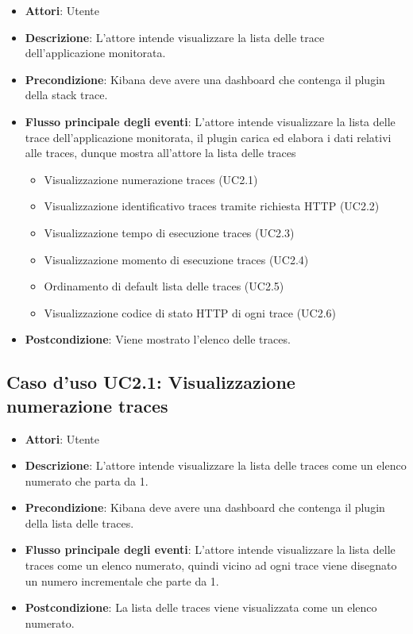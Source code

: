 \begin{itemize}
\item \textbf{Attori}: Utente
\item \textbf{Descrizione}: L'attore intende visualizzare la lista delle trace dell'applicazione monitorata. 
\item \textbf{Precondizione}: Kibana deve avere una dashboard che contenga il plugin della stack trace.
\item \textbf{Flusso principale degli eventi}: L'attore intende visualizzare la lista delle trace dell'applicazione monitorata, il plugin carica ed elabora i dati relativi alle traces, dunque mostra all'attore la lista delle traces
\begin{itemize}
\item Visualizzazione numerazione traces (UC2.1)
\item Visualizzazione identificativo traces tramite richiesta HTTP (UC2.2)
\item Visualizzazione tempo di esecuzione traces (UC2.3)
\item Visualizzazione momento di esecuzione traces (UC2.4)
\item Ordinamento di default lista delle traces (UC2.5)
\item Visualizzazione codice di stato HTTP di ogni trace (UC2.6)
\end{itemize}
\item \textbf{Postcondizione}: Viene mostrato l'elenco delle traces.
\end{itemize}
\subsection{Caso d'uso UC2.1: Visualizzazione numerazione traces}
\begin{itemize}
\item \textbf{Attori}: Utente
\item \textbf{Descrizione}: L'attore intende visualizzare la lista delle traces come un elenco numerato che parta da 1.
\item \textbf{Precondizione}: Kibana deve avere una dashboard che contenga il plugin della lista delle traces.
\item \textbf{Flusso principale degli eventi}: L'attore intende visualizzare la lista delle traces come un elenco numerato, quindi vicino ad ogni trace viene disegnato un numero incrementale che parte da 1.
\item \textbf{Postcondizione}: La lista delle traces viene visualizzata come un elenco numerato.
\end{itemize}
